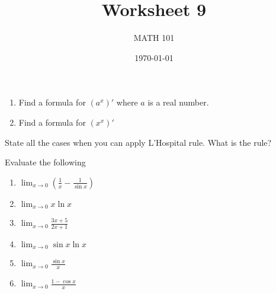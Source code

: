 \documentclass[12pt]{amsart}
\title{ Worksheet 9}
\author{MATH 101}
\date{\today}
\begin{document}
\maketitle

\begin{question}
	\begin{enumerate}
		\item Find a formula for $(a^x)'$ where $a$ is a real number.
		      \vspace{5cm}
		\item Find a formula for $(x^x)'$
		      \vspace{5cm}
	\end{enumerate}



\end{question}


\begin{question}
	State all the cases when you can apply L'Hospital rule.
	What is the rule?
\end{question}

\begin{question}
	Evaluate the following
	\begin{enumerate}
		\item $\displaystyle \lim_{x\to 0} \left( \frac{1}{x} - \frac{1}{\sin x}  \right)$
		      \vspace{5cm}
		\item $\displaystyle \lim_{x \to 0} x \ln x$
		      \vspace{5cm}
		\item $\displaystyle \lim_{x \to 0} \frac{3x + 5}{2x +1}$
		      \vspace{5cm}
		\item $\displaystyle \lim_{x \to 0} \sin x \ln x$
		      \vspace{5cm}
		\item $\displaystyle \lim_{x \to 0} \frac{\sin x}{x}$
		      \vspace{5cm}
		\item $\displaystyle \lim_{x \to 0} \frac{1 - \cos x}{x}$
		      \vspace{5cm}
	\end{enumerate}
\end{question}
\end{document}
